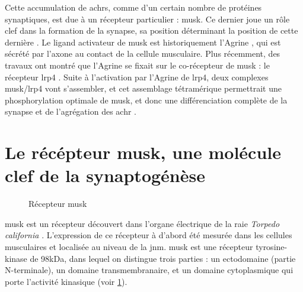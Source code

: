 Cette accumulation de \glspl{achr}, comme d'un certain nombre de protéines synaptiques, est due à un récepteur particulier : \gls{musk}. Ce dernier joue un rôle clef dans la formation de la synapse, sa position déterminant la position de cette dernière \cite{DeChiara1996, Glass1996}. Le ligand activateur de \gls{musk} est historiquement l'Agrine \cite{Glass1996}, qui est sécrété par l'axone au contact de la cellule musculaire. Plus récemment, des travaux ont montré que l'Agrine se fixait sur le co-récepteur de \gls{musk} : le récepteur \gls{lrp}4 \cite{Zhang2008, Kim2008}. Suite à l'activation par l'Agrine de \acrshort{lrp}4, deux complexes \gls{musk}/\gls{lrp}4 vont s'assembler, et cet assemblage tétramérique permettrait une phosphorylation optimale de \gls{musk}, et donc une différenciation complète de la synapse et de l'agrégation des \gls{achr} \cite{Zong2012}.

\section{Le récépteur \acrshort{musk}, une molécule clef de la synaptogénèse}
\label{sec:IntroMuSK}

\begin{figure}
	\caption{Récepteur \gls{musk}}
	\label{fig:RMuSK}
\end{figure}

\acrfull{musk} est un récepteur découvert dans l'organe électrique de la raie \emph{Torpedo california} \cite{Jennings1993}. L'expression de ce récepteur à d'abord été mesurée dans les cellules musculaires et localisée au niveau de la \gls{jnm}. \gls{musk} est une récepteur tyrosine-kinase de 98kDa, dans lequel on distingue trois parties : un ectodomaine (partie N-terminale), un domaine transmembranaire, et un domaine cytoplasmique qui porte l'activité kinasique (voir \cref{fig:RMuSK}). 

